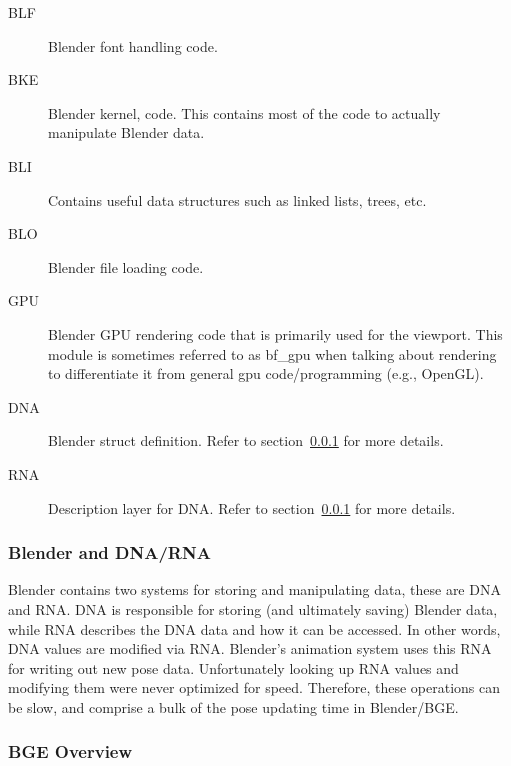 \begin{description}
 \item [BLF] Blender font handling code.
 \item [BKE] Blender kernel, code. This contains most of the code to actually manipulate Blender data.
 \item [BLI] Contains useful data structures such as linked lists, trees, etc.
 \item [BLO] Blender file loading code.
 \item [GPU] Blender GPU rendering code that is primarily used for the viewport. This module is sometimes referred to as bf\_gpu when talking about rendering to differentiate it from general gpu code/programming (e.g., OpenGL).
 \item [DNA] Blender struct definition. Refer to section~\ref{sec:bf_dna_rna} for more details.
 \item [RNA] Description layer for DNA. Refer to section~\ref{sec:bf_dna_rna} for more details.
\end{description}

\subsubsection{Blender and DNA/RNA}
\label{sec:bf_dna_rna}

Blender contains two systems for storing and manipulating data, these are DNA and RNA. DNA is responsible for storing (and ultimately saving) Blender data, while RNA describes the DNA data and how it can be accessed.
In other words, DNA values are modified via RNA.
Blender's animation system uses this RNA for writing out new pose data.
Unfortunately looking up RNA values and modifying them were never optimized for speed.
Therefore, these operations can be slow, and comprise a bulk of the pose updating time in Blender/BGE.


\subsubsection{BGE Overview}
\label{sec:bge_general_overview}


